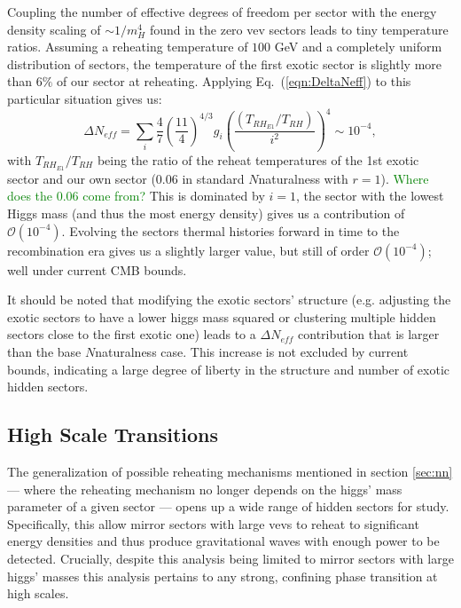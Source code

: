 \documentclass[nofootinbib,twocolumn,preprintnumbers]{revtex4-1}
\begin{document}
Coupling the number of effective degrees of freedom per sector with the energy density scaling of $\sim 1/m_H^4$ found in the zero vev sectors leads to tiny temperature ratios. Assuming a reheating temperature of $100$ GeV and a completely uniform distribution of sectors, the temperature of the first exotic sector is slightly more than $6\%$ of our sector at reheating. Applying Eq.~(\ref{eqn:DeltaNeff}) to this particular situation gives us:
\begin{equation}
\Delta N_{eff} = \sum_i \frac{4}{7}\left(\frac{11}{4}\right)^{4/3}g_{i} \left(\frac{(T_{RH_{E1}}/T_{RH})}{i^2}\right)^4 \sim 10^{-4},
\end{equation}     
with $T_{RH_{E1}}/T_{RH}$ being the ratio of the reheat temperatures of the 1st exotic sector and our own sector ($0.06$ in standard $N$naturalness with $r = 1$).  \textcolor{green}{Where does the $0.06$ come from?} This is dominated by $i=1$, the sector with the lowest Higgs mass (and thus the most energy density) gives us a contribution of $\mathcal{O} (10^{-4})$. Evolving the sectors thermal histories forward in time to the recombination era gives us a slightly larger value, but still of order $\mathcal{O}(10^{-4})$; well under current CMB bounds. 

It should be noted that modifying the exotic sectors' structure (e.g. adjusting the exotic sectors to have a lower higgs mass squared or clustering multiple hidden sectors close to the first exotic one) leads to a $\Delta N_{eff}$ contribution that is larger than the base $N$naturalness case. This increase is not excluded by current bounds, indicating a large degree of liberty in the structure and number of exotic hidden sectors.

\subsection{High Scale Transitions}

The generalization of possible reheating mechanisms mentioned in section \ref{sec:nn} --- where the reheating mechanism no longer depends on the higgs' mass parameter of a given sector --- opens up a wide range of hidden sectors for study. Specifically, this allow mirror sectors with large vevs to reheat to significant energy densities and thus produce gravitational waves with enough power to be detected. Crucially, despite this analysis being limited to mirror sectors with large higgs' masses this analysis pertains to any strong, confining phase transition at high scales.
\end{document}
